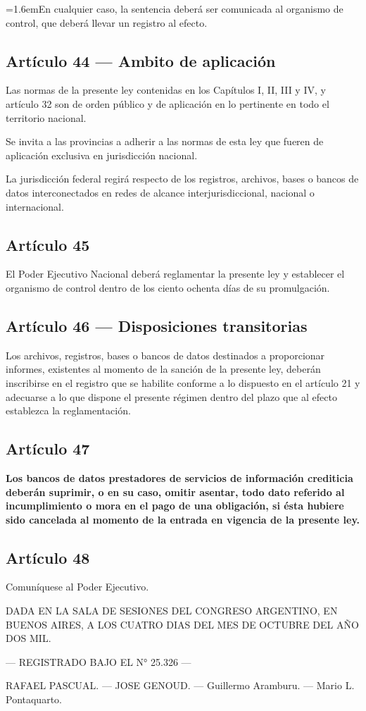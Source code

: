 \documentclass[10pt,a4paper]{article}
\newcommand{\articulo}[1]{\subsection{#1}}
\newcommand{\inciso}[2]{\par{\hangindent=1.6em\hangafter=1\makebox[1.6em][l]{#1}#2\par}}
\newcommand{\observado}[1]{\textbf{#1}}
\begin{document}
\inciso{4.}{En cualquier caso, la sentencia deberá ser comunicada al organismo de control, que deberá llevar un registro al efecto.}

\articulo{Artículo 44 --- Ambito de aplicación}
Las normas de la presente ley contenidas en los Capítulos I, II, III y IV, y artículo 32 son de orden público y de aplicación en lo pertinente en todo el territorio nacional.

Se invita a las provincias a adherir a las normas de esta ley que fueren de aplicación exclusiva en jurisdicción nacional.

La jurisdicción federal regirá respecto de los registros, archivos, bases o bancos de datos interconectados en redes de alcance interjurisdiccional, nacional o internacional.

\articulo{Artículo 45}
El Poder Ejecutivo Nacional deberá reglamentar la presente ley y establecer el organismo de control dentro de los ciento ochenta días de su promulgación.

\articulo{Artículo 46 --- Disposiciones transitorias}
Los archivos, registros, bases o bancos de datos destinados a proporcionar informes, existentes al momento de la sanción de la presente ley, deberán inscribirse en el registro que se habilite conforme a lo dispuesto en el artículo 21 y adecuarse a lo que dispone el presente régimen dentro del plazo que al efecto establezca la reglamentación.

\articulo{Artículo 47}
\observado{Los bancos de datos prestadores de servicios de información crediticia deberán suprimir, o en su caso, omitir asentar, todo dato referido al incumplimiento o mora en el pago de una obligación, si ésta hubiere sido cancelada al momento de la entrada en vigencia de la presente ley.}

\articulo{Artículo 48}
Comuníquese al Poder Ejecutivo.

\bigskip
\begin{center}DADA EN LA SALA DE SESIONES DEL CONGRESO ARGENTINO, EN BUENOS AIRES, A LOS CUATRO DIAS DEL MES DE OCTUBRE DEL AÑO DOS MIL.\end{center}
\begin{center}— REGISTRADO BAJO EL N° 25.326 —\end{center}
\begin{center}RAFAEL PASCUAL. — JOSE GENOUD. — Guillermo Aramburu. — Mario L. Pontaquarto.\end{center}
\end{document}
